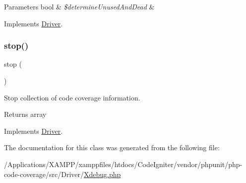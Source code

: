 \begin{DoxyParams}[1]{Parameters}
bool & {\em \$determine\+Unused\+And\+Dead} & \\
\hline
\end{DoxyParams}


Implements \mbox{\hyperlink{interface_sebastian_bergmann_1_1_code_coverage_1_1_driver_1_1_driver_aa3dfff26cb483c3eadbf2418e1729671}{Driver}}.

\mbox{\label{class_sebastian_bergmann_1_1_code_coverage_1_1_driver_1_1_xdebug_a8b6fc76a620d7557d06e9a11a9ffb509}} 
\subsubsection{\texorpdfstring{stop()}{stop()}}
{\footnotesize\ttfamily stop (\begin{DoxyParamCaption}{ }\end{DoxyParamCaption})}

Stop collection of code coverage information.

\begin{DoxyReturn}{Returns}
array 
\end{DoxyReturn}


Implements \mbox{\hyperlink{interface_sebastian_bergmann_1_1_code_coverage_1_1_driver_1_1_driver_a8b6fc76a620d7557d06e9a11a9ffb509}{Driver}}.



The documentation for this class was generated from the following file\+:\begin{DoxyCompactItemize}
\item 
/\+Applications/\+X\+A\+M\+P\+P/xamppfiles/htdocs/\+Code\+Igniter/vendor/phpunit/php-\/code-\/coverage/src/\+Driver/\mbox{\hyperlink{_xdebug_8php}{Xdebug.\+php}}\end{DoxyCompactItemize}
